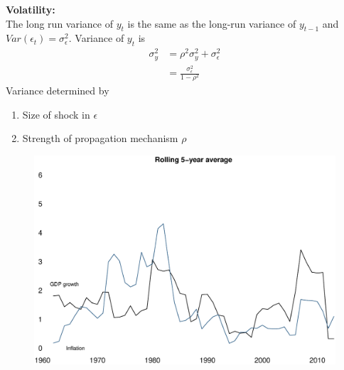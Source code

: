 \documentclass{beamer}
\begin{document}
\begin{frame}
  \textbf{Volatility:}\\ 
  \medskip
  The long run variance of $y_t$ is the same as the long-run variance of $y_{t-1}$  and $Var(\epsilon_t)=\sigma_\epsilon^2$.
  Variance of $y_t$ is 
  \begin{align}
  \sigma_y^2 &= \rho^2 \sigma_y^2 + \sigma_\epsilon^2\\ \nonumber
  &= \frac{\sigma_\epsilon^2}{1-\rho^2}
\end{align}
\medskip
  Variance determined by
  \begin{enumerate}
    \item Size of shock in $\epsilon$
    \item Strength of propagation mechanism $\rho$
  \end{enumerate}
\end{frame}

\begin{frame}
  \begin{figure}
    \includegraphics[scale=.3]{great_moderation.eps}
  \end{figure}
\end{frame}
\end{document}
